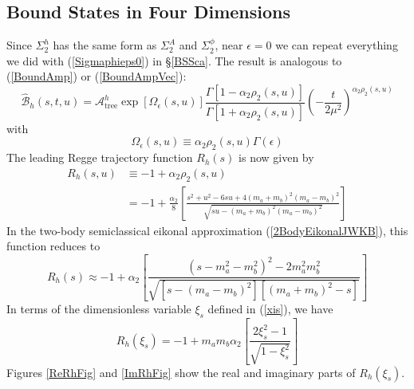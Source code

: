 \subsection{Bound States in Four Dimensions}
Since $\Sigma_{2}^{h}$ has the same form as $\Sigma_{2}^{A}$ and $\Sigma_{2}^{\phi}$, near $\epsilon = 0$ we can repeat everything we did with (\ref{Sigmaphieps0}) in \S\ref{BSSca}. The result is analogous to (\ref{BoundAmp}) or (\ref{BoundAmpVec}):
\begin{equation}
	\widehat{\mathcal{B}}_{h}(s, t, u) = \mathcal{A}_{\text{tree}}^{h} \exp{[ \Omega_{\epsilon}(s, u)]} \frac{\Gamma[1 - \alpha_{2} \rho_{2}(s, u)]}{\Gamma[1 + \alpha_{2} \rho_{2}(s, u)]} \left( -\frac{t}{2 \mu^{2}} \right)^{\alpha_{2} \rho_{2}(s, u)} \label{BoundAmpTen}
\end{equation}
with
\begin{equation}
	\Omega_{\epsilon}(s, u) \equiv \alpha_{2} \rho_{2}(s, u) \Gamma(\epsilon)
\end{equation}
The leading Regge trajectory function $R_{h}(s)$ is now given by
\begin{align}
	R_{h}(s, u) &\equiv -1 + \alpha_{2} \rho_{2}(s, u) \nonumber \\
	&= -1 + \frac{\alpha_{2}}{8} \left[ \frac{s^{2} + u^{2} - 6 s u + 4 (m_{a} + m_{b})^{2} (m_{a} - m_{b})^{2}}{\sqrt{s u - (m_{a} + m_{b})^{2} (m_{a} - m_{b})^{2}}} \right]
\end{align}
In the two-body semiclassical eikonal approximation (\ref{2BodyEikonalJWKB}), this function reduces to
\begin{equation}
	R_{h}(s) \approx -1 + \alpha_{2} \left[ \frac{(s - m_{a}^{2} - m_{b}^{2})^{2} - 2 m_{a}^{2} m_{b}^{2}}{\sqrt{[s - (m_{a} - m_{b})^{2}] [(m_{a} + m_{b})^{2} - s]}} \right]
\end{equation}
In terms of the dimensionless variable $\xi_{s}$ defined in (\ref{xis}), we have
\begin{equation}
	R_{h}(\xi_{s}) = -1 + m_{a} m_{b} \alpha_{2} \left[ \frac{2 \xi_{s}^{2} - 1}{\sqrt{1 - \xi_{s}^{2}}} \right]
\end{equation}
Figures \ref{ReRhFig} and \ref{ImRhFig} show the real and imaginary parts of $R_{h}(\xi_{s})$.

